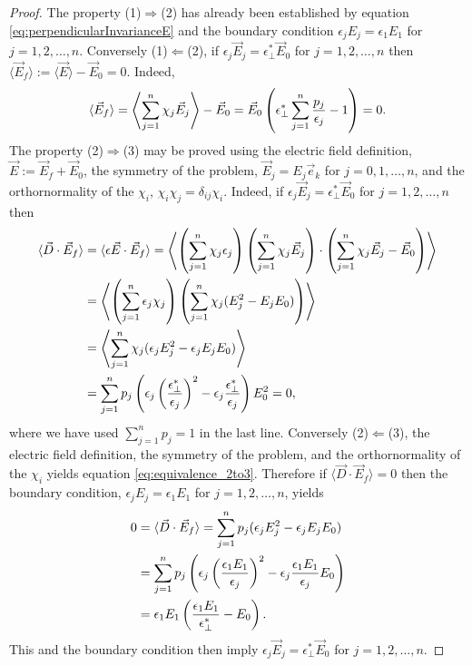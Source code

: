 \documentclass[english,12pt]{ttuthes}
\begin{document}
\begin{proof}
%
The property (1)$\Rightarrow$(2) has already been established by equation
\eqref{eq:perpendicularInvarianceE} and the boundary condition
$\epsilon_jE_j=\epsilon_1E_1$ for $j=1,2,\ldots,n$. Conversely (1)$\Leftarrow$(2), if 
$\epsilon_j\vec{E}_j=\epsilon^*_\perp\vec{E}_0$ for $j=1,2,\ldots,n$ then
$\langle\vec{E}_f\rangle:=\langle\vec{E}\rangle-\vec{E}_0=0$. Indeed, 
%
\begin{align}
  \langle\vec{E}_f\rangle
  =\left\langle\sum_{j=1}^n\chi_j\vec{E}_j\right\rangle-\vec{E}_0
  =\vec{E}_0\left(\epsilon^*_\perp\sum_{j=1}^n\frac{p_j}{\epsilon_j}-1\right)=0.\notag
\end{align}
%
The property (2)$\Rightarrow$(3) may be proved using the electric field
definition, $\vec{E}:=\vec{E}_f+\vec{E}_0$, the symmetry of the
problem, $\vec{E}_j=E_j\vec{e}_k$ for $j=0,1,\ldots,n$, and the
orthornormality of the $\chi_i$, $\chi_i\chi_j=\delta_{ij}\chi_i$. Indeed, if
$\epsilon_j\vec{E}_j=\epsilon^*_\perp\vec{E}_0$ for $j=1,2,\ldots,n$ then   
%
\begin{align}\label{eq:equivalence_2to3}
  \langle\vec{D}\cdot\vec{E}_f\rangle&= \langle\epsilon\vec{E}\cdot\vec{E}_f\rangle=
  \left\langle\left(\sum_{j=1}^n\chi_j\epsilon_j\right)\left(\sum_{j=1}^n\chi_j\vec{E}_j\right)\cdot
    \left(\sum_{j=1}^n\chi_j\vec{E}_j-\vec{E}_0\right)\right\rangle \notag\\
  &=\left\langle
    \left(\sum_{j=1}^n\epsilon_j\chi_j\right)\left(\sum_{j=1}^n\chi_j(E_j^2-E_jE_0)\right)
    \right\rangle\notag\\
  &=\left\langle\sum_{j=1}^n\chi_j(\epsilon_jE_j^2-\epsilon_jE_jE_0)\right\rangle\\
  &=\sum_{j=1}^np_j\left(
     \epsilon_j\left(\frac{\epsilon^*_\perp}{\epsilon_j}\right)^2-\epsilon_j\frac{\epsilon^*_\perp}{\epsilon_j}
           \right)E_0^2=0,\notag
\end{align}
%
where we have used $\sum_{j=1}^np_j=1$ in the last line. Conversely (2)$\Leftarrow$(3), the
electric field definition, the symmetry of the problem, and the
orthornormality of the $\chi_i$ yields equation
\eqref{eq:equivalence_2to3}. Therefore if $\langle\vec{D}\cdot\vec{E}_f\rangle=0$ then
the boundary condition, $\epsilon_jE_j=\epsilon_1E_1$ for $j=1,2,\ldots,n$, yields
%
\begin{align*}
  0&= \langle\vec{D}\cdot\vec{E}_f\rangle=\sum_{j=1}^np_j(\epsilon_jE_j^2-\epsilon_jE_jE_0)\\
   &=\sum_{j=1}^np_j\left(
             \epsilon_j\left(\frac{\epsilon_1E_1}{\epsilon_j}\right)^2-\epsilon_j\frac{\epsilon_1E_1}{\epsilon_j}E_0
            \right)\notag\\
   &=\epsilon_1E_1\left(\frac{\epsilon_1E_1}{\epsilon^*_\perp}-E_0\right)\notag.        
\end{align*}
%
This and the boundary condition then imply
$\epsilon_j\vec{E}_j=\epsilon^*_\perp\vec{E}_0$ for $j=1,2,\ldots,n$.
%
\end{proof}
%
\end{document}
